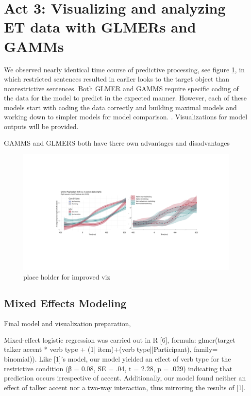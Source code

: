 \section{Act 3: Visualizing and analyzing ET data with GLMERs and GAMMs}
We observed nearly identical time course of predictive processing, see figure \ref{fig:comparitive}, in which restricted sentences resulted in earlier looks to the target object than nonrestrictive sentences. Both GLMER and GAMMS require specific coding of the data for the model to predict in the expected manner.  However, each of these models start with coding the data correctly and building maximal models and working down to simpler models for model comparison. \parencite{max model}. Visualizations for model outputs will be provided.

GAMMS and GLMERS both have there own advantages and disadvantages \parencite{Ito_Knoeferle_2022}
\begin{figure}[h]
    \centering
    \includegraphics[width=\textwidth]{figures/comparitive.jpeg}
    \caption{place holder for improved viz}
    \label{fig:comparitive}
\end{figure}

\subsection{Mixed Effects Modeling}
Final model and visualization preparation, 

Mixed-effect logistic regression was carried out in R [6], formula: glmer(target ~ talker accent * verb type + (1| item)+(verb type||Participant), family= binomial)). Like [1]’s model, our model yielded an effect of verb type for the restrictive condition (β = 0.08, SE = .04, t = 2.28, p = .029) indicating that prediction occurs irrespective of accent. Additionally, our model found neither an effect of talker accent nor a two-way interaction, thus mirroring the results of [1].

